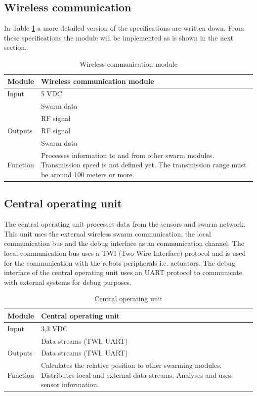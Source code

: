 \documentclass[10pt,a4paper]{article}
\begin{document}
\subsection{Wireless communication}

In Table \ref{wcm} a more detailed version of the specifications are written down. From these specifications the module will be implemented as is shown in the next section. 

\begin{table}[H]
\centering
\caption{Wireless communication module}
\label{wcm}
\begin{tabular}{|p{}|p{}|}
\hline
Module   & Wireless communication module                                       \\ \hline
Input    & 5 VDC\\ 
        & Swarm data\\
        & RF signal                                              \\ \hline
Outputs  & RF signal                                           \\ 
& Swarm data \\ \hline
Function & Processes information to and from other swarm modules. Transmission speed is not defined yet. The transmission range must be around 100 meters or more. \\ \hline
\end{tabular}
\end{table}
\subsection{Central operating unit}
The central operating unit processes data from the sensors and swarm network. This unit uses the external wireless swarm communication, the local communication bus and the debug interface as an communication channel. The local communication bus uses a TWI (Two Wire Interface) protocol and is used for the communication with the robots peripherals i.e. actuators. The debug interface of the central operating unit uses an UART protocol to communicate with external systems for debug purposes.

\begin{table}[H]
\centering
\caption{Central operating unit}
\label{cou}
\begin{tabular}{|p{}|p{}|}
\hline
Module   & Central operating unit                                        \\ \hline
Input    & 3,3 VDC \\
         & Data streams (TWI, UART)                                           \\ \hline
Outputs  & Data streams (TWI, UART)                                             \\ \hline
Function & Calculates the relative position to other swarming modules. Distributes local and external data streams. Analyses and uses sensor information.\\ \hline
\end{tabular}
\end{table}
\end{document}
